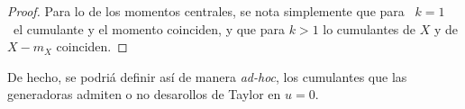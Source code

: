 {\begin{proof}
  Para lo de los momentos centrales, se nota simplemente que para \ $k = 1$ \ el
  cumulante y el momento coinciden, y que para $k > 1$ lo cumulantes de $X$ y de
  $X-m_X$ coinciden.
\end{proof}
%

De hecho,  se podri\'a definir as\'i  de manera {\em ad-hoc},  los cumulantes que
las generadoras admiten o no desarollos de Taylor en $u = 0$.

\

}
